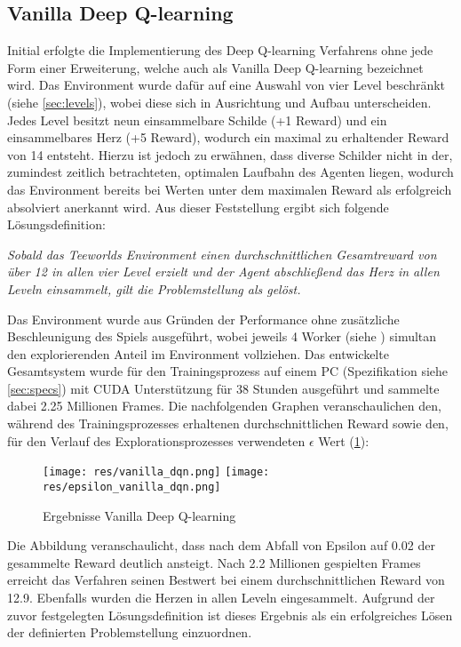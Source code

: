 \documentclass[11pt]{scrartcl}
\begin{document}
\subsection{Vanilla Deep Q-learning}
Initial erfolgte die Implementierung des Deep Q-learning Verfahrens ohne jede Form einer Erweiterung,
welche auch als Vanilla Deep Q-learning bezeichnet wird. Das Environment wurde dafür auf eine Auswahl
von vier Level beschränkt (siehe \autoref{sec:levels}), wobei diese sich in Ausrichtung und Aufbau
unterscheiden. Jedes Level besitzt neun einsammelbare Schilde (+1 Reward) und ein einsammelbares
Herz (+5 Reward), wodurch ein maximal zu erhaltender Reward von 14 entsteht. Hierzu ist jedoch zu
erwähnen, dass diverse Schilder nicht in der, zumindest zeitlich betrachteten, optimalen Laufbahn
des Agenten liegen, wodurch das Environment bereits bei Werten unter dem maximalen Reward als
erfolgreich absolviert anerkannt wird. Aus dieser Feststellung ergibt sich folgende
Lösungsdefinition:

\textit{Sobald das Teeworlds Environment einen durchschnittlichen Gesamtreward von über 12 in allen
vier Level erzielt und der Agent abschließend das Herz in allen Leveln einsammelt, gilt die
Problemstellung als gelöst.}

Das Environment wurde aus Gründen der Performance ohne zusätzliche Beschleunigung des Spiels
ausgeführt, wobei jeweils 4 Worker (siehe ) simultan den
explorierenden Anteil im Environment vollziehen. Das entwickelte Gesamtsystem wurde für den
Trainingsprozess auf einem PC (Spezifikation siehe \autoref{sec:specs}) mit CUDA Unterstützung
für 38 Stunden ausgeführt und sammelte dabei 2.25 Millionen Frames. Die nachfolgenden Graphen
veranschaulichen den, während des Trainingsprozesses erhaltenen durchschnittlichen Reward sowie
den, für den Verlauf des Explorationsprozesses verwendeten $\epsilon$ Wert (\ref{fig:vanilla-dqn}):

\begin{figure}[htp]
\centering
\texttt{[image: res/vanilla\_dqn.png]}
\texttt{[image: res/epsilon\_vanilla\_dqn.png]}
\caption{Ergebnisse Vanilla Deep Q-learning}
\label{fig:vanilla-dqn}
\end{figure}

\newpage
Die Abbildung veranschaulicht, dass nach dem Abfall von Epsilon auf 0.02 der gesammelte Reward deutlich
ansteigt. Nach 2.2 Millionen gespielten Frames erreicht das Verfahren seinen Bestwert bei einem
durchschnittlichen Reward von 12.9. Ebenfalls wurden die Herzen in allen Leveln eingesammelt. Aufgrund
der zuvor festgelegten Lösungsdefinition ist dieses Ergebnis als ein erfolgreiches Lösen der definierten
Problemstellung einzuordnen.
\end{document}
